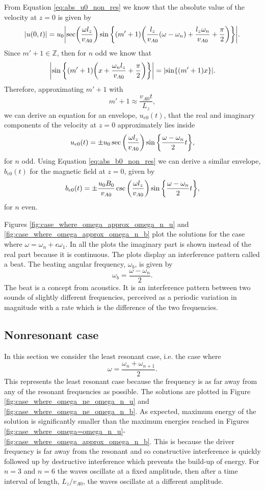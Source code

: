 From Equation \eqref{eq:abs_u0_non_res} we know that the absolute value of the velocity at $z=0$ is given by
\[
    |u(0,t)|=u_0\abs{\sec(\frac{\omega l_z}{v_{A0}})\sin\qty{(m'+1)\qty(\frac{l_z}{v_{A0}}(\omega-\omega_n)+\frac{l_z \omega_n}{v_{A0}}+\frac{\pi}{2})}}.
\]
Since $m'+1\in\mathds{Z}$, then for $n$ odd we know that
\[\abs{\sin\qty{(m'+1)\qty(x + \frac{\omega_n l_z}{v_{A0}}+\frac{\pi}{2})}}=\abs{\sin\{(m'+1)x\}}.\]
Therefore, approximating $m'+1$ with 
\[m'+1\approx \frac{v_{A0} t}{L_z},\]
we can derive an equation for an envelope, $u_{e0}(t)$, that the real and imaginary components of the velocity at $z=0$ approximately lies inside
\begin{equation}
    \label{eq:u0_envelope}
    u_{e0}(t) = \pm u_0\sec\qty(\frac{\omega l_z}{v_{A0}})\sin\qty{\frac{\omega - \omega_n}{2}t},
\end{equation}
for $n$ odd.
Using Equation \eqref{eq:abs_b0_non_res} we can derive a similar envelope, $b_{e0}(t)$ for the magnetic field at $z=0$, given by
\begin{equation}
    \label{eq:b0_envelope}
    b_{e0}(t)=\pm \frac{u_0B_0}{v_{A0}}\csc\qty(\frac{\omega l_z}{v_{A0}})\sin\qty{\frac{\omega - \omega_n}{2}t},
\end{equation}
for $n$ even.

Figures \ref{fig:case_where_omega_approx_omega_n_u} and \ref{fig:case_where_omega_approx_omega_n_b} plot the solutions for the case where $\omega=\omega_n+\epsilon \omega_1$. In all the plots the imaginary part is shown instead of the real part because it is continuous. The plots display an interference pattern called a beat. The beating angular frequency, $\omega_b$, is given by
\begin{equation}
    \omega_b = \frac{\omega - \omega_n}{2}.
\end{equation}
The beat is a concept from acoustics. It is an interference pattern between two sounds of slightly different frequencies, perceived as a periodic variation in magnitude with a rate which is the difference of the two frequencies.

\subsection{Nonresonant case}
\label{sec:case_where_omega_ne_omega_n}

In this section we consider the least resonant case, i.e. the case where
\[\omega = \frac{\omega_{n}+\omega_{n+1}}{2}.\]
This represents the least resonant case because the frequency is as far away from any of the resonant frequencies as possible. The solutions are plotted in Figure \ref{fig:case_where_omega_ne_omega_n_u} and \ref{fig:case_where_omega_ne_omega_n_b}. As expected, maximum energy of the solution is significantly smaller than the maximum energies reached in Figures \ref{fig:case_where_omega=omega_n_u}-\ref{fig:case_where_omega_approx_omega_n_b}. This is because the driver frequency is far away from the resonant and so constructive interference is quickly followed up by destructive interference which prevents the build-up of energy. For $n=3$ and $n=6$ the waves oscillate at a fixed amplitude, then after a time interval of length, $L_z / v_{A0}$, the waves oscillate at a different amplitude.

